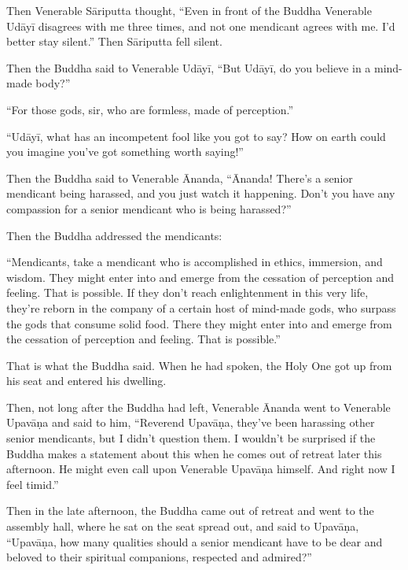 \documentclass[12pt,openany]{book}%
\begin{document}
Then Venerable \textsanskrit{Sāriputta} thought, “Even in front of the Buddha Venerable \textsanskrit{Udāyī} disagrees with me three times, and not one mendicant agrees with me. I’d better stay silent.” Then \textsanskrit{Sāriputta} fell silent. 

Then the Buddha said to Venerable \textsanskrit{Udāyī}, “But \textsanskrit{Udāyī}, do you believe in a mind-made body?” 

“For those gods, sir, who are formless, made of perception.” 

“\textsanskrit{Udāyī}, what has an incompetent fool like you got to say? How on earth could you imagine you’ve got something worth saying!” 

Then the Buddha said to Venerable Ānanda, “Ānanda! There’s a senior mendicant being harassed, and you just watch it happening. Don’t you have any compassion for a senior mendicant who is being harassed?” 

Then the Buddha addressed the mendicants: 

“Mendicants, take a mendicant who is accomplished in ethics, immersion, and wisdom. They might enter into and emerge from the cessation of perception and feeling. That is possible. If they don’t reach enlightenment in this very life, they’re reborn in the company of a certain host of mind-made gods, who surpass the gods that consume solid food. There they might enter into and emerge from the cessation of perception and feeling. That is possible.” 

That is what the Buddha said. When he had spoken, the Holy One got up from his seat and entered his dwelling. 

Then, not long after the Buddha had left, Venerable Ānanda went to Venerable \textsanskrit{Upavāṇa} and said to him, “Reverend \textsanskrit{Upavāṇa}, they’ve been harassing other senior mendicants, but I didn’t question them. I wouldn’t be surprised if the Buddha makes a statement about this when he comes out of retreat later this afternoon. He might even call upon Venerable \textsanskrit{Upavāṇa} himself. And right now I feel timid.” 

Then in the late afternoon, the Buddha came out of retreat and went to the assembly hall, where he sat on the seat spread out, and said to \textsanskrit{Upavāṇa}, “\textsanskrit{Upavāṇa}, how many qualities should a senior mendicant have to be dear and beloved to their spiritual companions, respected and admired?” 
\end{document}
